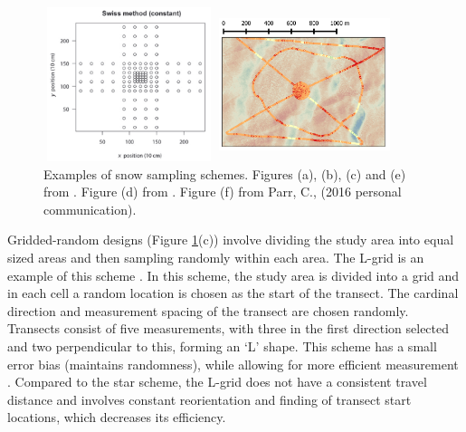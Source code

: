 \documentclass{sfuthesis}
\begin{document}
\begin{figure}[H]
\begin{minipage}[c][11cm][t]{.33\textwidth}
\end{minipage}%
\begin{minipage}[c][11cm][t]{.33\textwidth}
        \vspace*{\fill}
  \centering
    \includegraphics[width=5cm,height=4.5cm]{swiss.png}
   \par\vfill
   \includegraphics[width=5cm,height=4.5cm]{hourglass.png}
\end{minipage}
\caption{Examples of snow sampling schemes. Figures (a), (b), (c) and (e) from \cite{Shea2010}. Figure (d) from \cite{Schweizer2008}. Figure (f) from Parr, C., (2016 personal communication).}
\label{schemes}
\end{figure}

Gridded-random designs (Figure \ref{schemes}(c)) involve dividing the study area into equal sized areas and then sampling randomly within each area. The L-grid is an example of this scheme \citep{Bellaire2008, Elder2009, Bellaire2011}. In this scheme, the study area is divided into a grid and in each cell a random location is chosen as the start of the transect. The cardinal direction and measurement spacing of the transect are chosen randomly. Transects consist of five measurements, with three in the first direction selected and two perpendicular to this, forming an `L' shape. This scheme has a small error bias (maintains randomness), while allowing for more efficient measurement \citep{Shea2010}. Compared to the star scheme, the L-grid does not have a consistent travel distance and involves constant reorientation and finding of transect start locations, which decreases its efficiency. 
\end{document}
